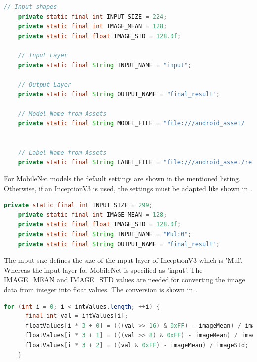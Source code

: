 \begin{minipage}{\linewidth}
\begin{lstlisting}[caption=Including the model in the mobile application, label=list:include_model, language=java]
    // Input shapes
    private static final int INPUT_SIZE = 224;
    private static final int IMAGE_MEAN = 128;
    private static final float IMAGE_STD = 128.0f;

    // Input Layer
    private static final String INPUT_NAME = "input";

    // Output Layer
    private static final String OUTPUT_NAME = "final_result";

    // Model Name from Assets
    private static final String MODEL_FILE = "file:///android_asset/				opt4_retrained_dog_graph_mobilenet_0.50_224_700_0.007.pb";


    // Label Name from Assets
    private static final String LABEL_FILE = "file:///android_asset/retrained_dog_labels_mobilenet_0.50_224_700_0.007.txt";
\end{lstlisting}
\end{minipage}

For MobileNet models the default settings are shown in the mentioned listing. Otherwise, if an InceptionV3 is used, the settings must be adapted like shown in .

\begin{minipage}{\linewidth}
\begin{lstlisting}[caption=Setup for InceptionV3, label=list:include_inception, language=java]
    private static final int INPUT_SIZE = 299;
    private static final int IMAGE_MEAN = 128;
    private static final float IMAGE_STD = 128.0f;
    private static final String INPUT_NAME = "Mul:0";
    private static final String OUTPUT_NAME = "final_result";
\end{lstlisting}
\end{minipage}

The input size defines the size of the input layer of InceptionV3 which is 'Mul'. Whereas the input layer for MobileNet is specified as 'input'. The IMAGE_MEAN and IMAGE_STD values are needed for converting the image data from integer into float values. The conversion is shown in .

\begin{minipage}{\linewidth}
\begin{lstlisting}[caption=Conversion of image data integer to float, label=list:int_conversion, language=java]
	for (int i = 0; i < intValues.length; ++i) {
      final int val = intValues[i];
      floatValues[i * 3 + 0] = (((val >> 16) & 0xFF) - imageMean) / imageStd;
      floatValues[i * 3 + 1] = (((val >> 8) & 0xFF) - imageMean) / imageStd;
      floatValues[i * 3 + 2] = ((val & 0xFF) - imageMean) / imageStd;
    }
\end{lstlisting}
\end{minipage}

